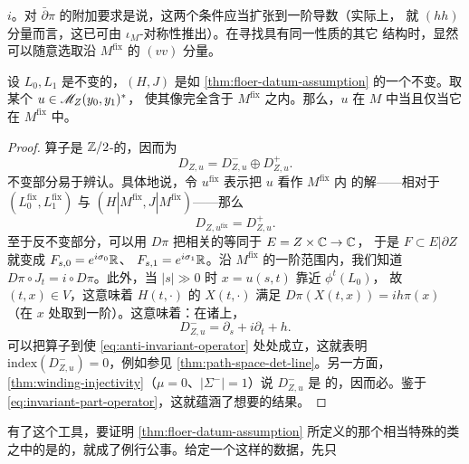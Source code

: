 $i$。对 $\bar{\partial}\pi$ 的附加要求是说，这两个条件应当扩张到一阶导数（实际上，
就 $(hh)$ 分量而言，这已可由 $\iota_M$-对称性推出）。在寻找具有同一性质的其它%
\trAlmostComplex{}结构时，显然可以随意选取沿 $M^{\mathrm{fix}}$ 的 $(vv)$ 分量。
\begin{lemma}\label{thm:regularity-fixed-set}
设 $L_0,L_1$ 是不变的\trExact\trLagrange\trSubmanifold，$(H,J)$ 是如%
\cref{thm:floer-datum-assumption} 的一个不变\trFloerDatum。取某个 $u\in\mathscr{M}_Z(y_0,y_1)^*$，
使其像完全含于 $M^{\mathrm{fix}}$ 之内。那么，$u$ 在 $M$ 中\trRegular{}当且仅当它在
$M^{\mathrm{fix}}$ 中\trRegular{}。
\end{lemma}
\begin{proof}
\trLinearization{}算子是 $\mathbb{Z}/2$-\trEquivariant{}的，因而\trSplitting{}为
\begin{equation*}
D_{Z,u}=D^-_{Z,u}\oplus D^+_{Z,u}.
\end{equation*}
不变部分易于辨认。具体地说，令 $u^{\mathrm{fix}}$ 表示把 $u$ 看作 $M^{\mathrm{fix}}$ 内%
\trFloerEquation{}的解——相对于\trLagrange\trSubmanifold{} $(L^{\mathrm{fix}}_0,
L^{\mathrm{fix}}_1)$ 与\trFloerDatum{} $(H|M^{\mathrm{fix}},J|M^{\mathrm{fix}})$——那么
\begin{equation}\label{eq:invariant-part-operator}
D_{Z,u^{\mathrm{fix}}}=D^+_{Z,u}.
\end{equation}
至于反不变部分，可以用 $D\pi$ 把相关的\trVectorBundle{}等同于 $E=Z\times\mathbb{C}\to\mathbb{C}$，
于是\trSubbundle{} $F\subset E|\partial Z$ 就变成 $F_{s,0}=e^{i\sigma_0}\mathbb{R}$、
$F_{s,1}=e^{i\sigma_1}\mathbb{R}$。沿 $M^{\mathrm{fix}}$ 的一阶范围内，我们知道
$D\pi\circ J_t=i\circ D\pi$。此外，当 $|s|\gg 0$ 时 $x=u(s,t)$ 靠近 $\phi^t(L_0)$，
故 $(t,x)\in V$，这意味着 $H(t,\cdot)$ 的\trHamiltonianVectorField{} $X(t,\cdot)$
满足 $D\pi(X(t,x))=ih\pi(x)$（在 $x$ 处取到一阶）。这意味着：在诸\trStriplikeEnd{}上，
\begin{equation}\label{eq:anti-invariant-operator}
D^-_{Z,u}=\partial_s+i\partial_t+h.
\end{equation}
可以把算子\trDeformation{}到使 \eqref{eq:anti-invariant-operator} 处处成立，这就表明
$\mathrm{index}(D^-_{Z,u})=0$，例如参见 \cref{thm:path-space-det-line}。另一方面，
\cref{thm:winding-injectivity}（$\mu=0$、$|\Sigma^-|=1$）说 $D^-_{Z,u}$ 是\trInjective{}
的，因而必\trInvertible{}。鉴于 \eqref{eq:invariant-part-operator}，这就蕴涵了想要的结果。
\end{proof}
有了这个工具，要证明 \cref{thm:floer-datum-assumption} 所定义的那个相当特殊的类
之中的\trFloerDatum{}是\trGeneric{}\trRegular{}的，就成了例行公事。给定一个这样的数据，先只
